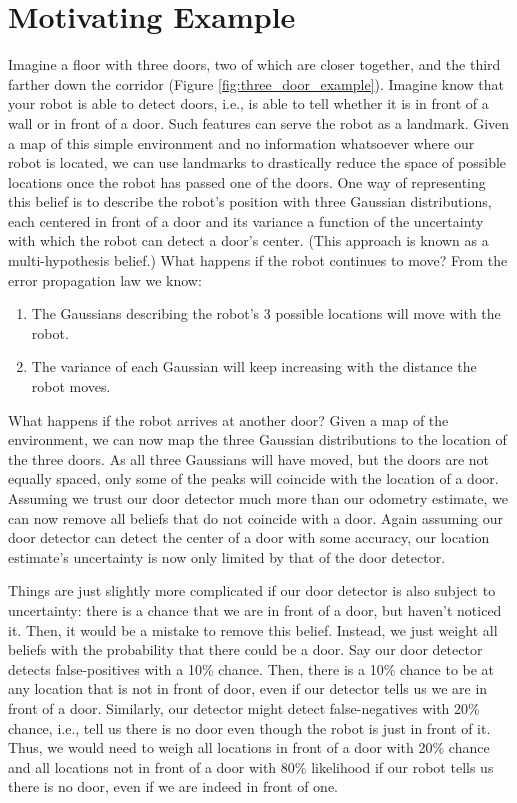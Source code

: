 \section{Motivating Example}
Imagine a floor with three doors, two of which are closer together, and the third farther down the corridor (Figure \ref{fig:three_door_example}). Imagine know that your robot is able to detect doors, i.e., is able to tell whether it is in front of a wall or in front of a door. Such features can serve the robot as a landmark. Given a map of this simple environment and no information whatsoever where our robot is located, we can use landmarks to drastically reduce the space of possible locations once the robot has passed one of the doors. One way of representing this belief is to describe the robot's position with three Gaussian distributions, each centered in front of  a door and its variance a function of the uncertainty with which the robot can detect a door's center. (This approach is known as a multi-hypothesis belief.) What happens if the robot continues to move? From the error propagation law we know:
\begin{enumerate}
\item The Gaussians describing the robot's 3 possible locations will move with the robot.
\item The variance of each Gaussian will keep increasing with the distance the robot moves.
\end{enumerate}
What happens if the robot arrives at another door? Given a map of the environment, we can now map the three Gaussian distributions to the location of the three doors. As all three Gaussians will have moved, but the doors are not equally spaced, only some of the peaks will coincide with the location of  a door. Assuming we trust our door detector much more than our odometry estimate, we can now remove all beliefs that do not coincide with a door. Again assuming our door detector can detect the center of a door with some accuracy, our location estimate's uncertainty is now only limited by that of the door detector.


Things are just slightly more complicated if our door detector is also subject to uncertainty: there is a chance that we are in front of a door, but haven't noticed it. Then, it would be a mistake to remove this belief. Instead, we just weight all beliefs with the probability that there could be a door. Say our door detector detects false-positives with a 10\% chance. Then, there is a 10\% chance to be at any location that is not in front of door, even if our detector tells us we are in front of a door. Similarly, our detector might detect false-negatives with 20\% chance, i.e., tell us there is no door even though the robot is just in front of it. Thus, we would need to weigh all locations in front of a door with 20\% chance and all locations not in front of a door with 80\% likelihood if our robot tells us there is no door, even if we are indeed in front of one.

